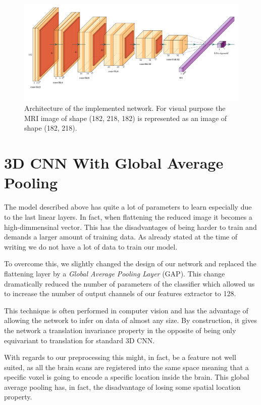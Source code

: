 \begin{figure}
    \centering
    \includegraphics[width=1\linewidth]{figures/models/standard_cnn_model.pdf}
    \caption{Architecture of the implemented network. For visual purpose the MRI image of shape (182, 218, 182) is represented as an image of shape (182, 218).}
    \label{fig:standard_cnn_model}
\end{figure}

\section{3D CNN With Global Average Pooling}

The model described above has quite a lot of parameters to learn especially due to the last linear layers. In fact, when flattening the reduced image it becomes a high-dimmensinal vector. This has the disadvantages of being harder to train and demands a larger amount of training data. As already stated at the time of writing we do not have a lot of data to train our model. 

To overcome this, we slightly changed the design of our network and replaced the flattening layer by a \textit{Global Average Pooling Layer}\cite{GAP_lin2013network} (GAP). This change dramatically reduced the number of parameters of the classifier which allowed us to increase the number of output channels of our features extractor to 128.  

This technique is often performed in computer vision and has the advantage of allowing the network to infer on data of almost any size. By construction, it gives the network a translation invariance property in the opposite of being only equivariant to translation for standard 3D CNN.

With regards to our preprocessing this might, in fact, be a feature not well suited, as all the brain scans are registered into the same space meaning that a specific voxel is going to encode a specific location inside the brain. This global average pooling has, in fact, the disadvantage of losing some spatial location property.


